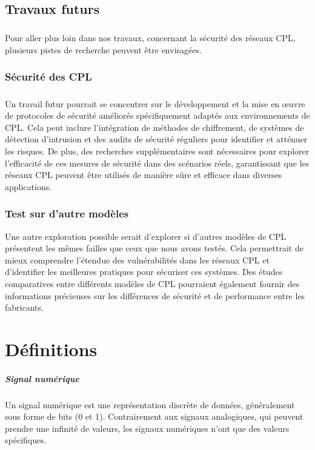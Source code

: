 \documentclass[a4paper,twocolumn]{report}
\begin{document}
\section{Travaux futurs}
\paragraph{}Pour aller plus loin dans nos travaux, concernant la sécurité des réseaux CPL, plusieurs pistes de recherche peuvent être envisagées.
\subsection{Sécurité des CPL}
\paragraph{}Un travail futur pourrait se concentrer sur le développement et la mise en œuvre
de protocoles de sécurité améliorés spécifiquement adaptés aux environnements de CPL.
Cela peut inclure l'intégration de méthodes de chiffrement, de systèmes de détection
d'intrusion et des audits de sécurité réguliers pour identifier et atténuer les risques.
De plus, des recherches supplémentaires sont nécessaires pour explorer l'efficacité de
ces mesures de sécurité dans des scénarios réels, garantissant que les réseaux CPL
peuvent être utilisés de manière sûre et efficace dans diverses applications.
\subsection{Test sur d'autre modèles}Une autre exploration possible serait d'explorer si d'autres modèles de CPL
présentent les mêmes failles que ceux que nous avons testés. Cela permettrait de
mieux comprendre l'étendue des vulnérabilités dans les réseaux CPL et d'identifier
les meilleures pratiques pour sécuriser ces systèmes. Des études comparatives entre
différents modèles de CPL pourraient également fournir des informations précieuses
sur les différences de sécurité et de performance entre les fabricants.

\appendix
\chapter{Définitions}
\paragraph{Signal numérique} Un signal numérique est une représentation discrète
de données, généralement sous forme de bits (0 et 1). Contrairement aux signaux analogiques,
qui peuvent prendre une infinité de valeurs, les signaux numériques n'ont que des valeurs spécifiques.
\end{document}
